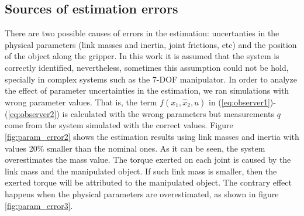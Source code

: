\documentclass[a4paper, 10pt]{article}
\begin{document}
\subsection{Sources of estimation errors}
There are two possible causes of errors in the estimation: uncertanties in the physical parameters (link masses and inertia, joint frictions, etc) and the position of the object along the gripper. In this work it is assumed that the system is correctly identified, nevertheless, sometimes this assumption could not be hold, specially in complex systems such as the 7-DOF manipulator. In order to analyze the effect of parameter uncertainties in the estimation, we ran simulations with wrong parameter values. That is, the term $f(x_1, \hat{x}_2, u)$ in (\ref{eq:observer1})-(\ref{eq:observer2}) is calculated with the wrong parameters but measurements $q$ come from the system simulated with the correct values. Figure \ref{fig:param_error2} shows the estimation results using link masses and inertia with values 20\% smaller than the nominal ones. As it can be seen, the system overestimates the mass value. The torque exerted on each joint is caused by the link mass and the manipulated object. If such link mass is smaller, then the exerted torque will be attributed to the manipulated object. The contrary effect happens when the physical parameters are overestimated, as shown in figure \ref{fig:param_error3}.
\end{document}
